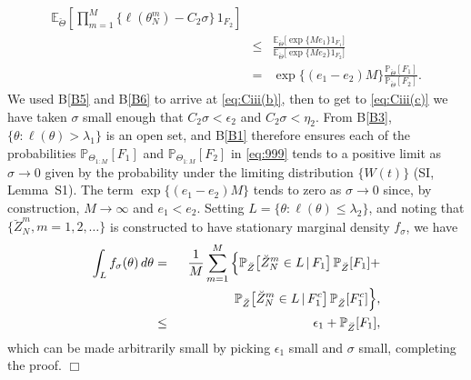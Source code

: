 \documentclass{pnastwo}\usepackage[]{graphicx}\usepackage[]{color}
\newcommand\levelii{{\lambda_2}}
\newcommand\given{{\, | \,}}
\newcommand\lik{\ell}
\newcommand\listB{B}
\newcommand\Cii{C_2}
\newcommand\Msigma{M}
\newcommand\prob{\mathbb{P}}
\newcommand\E{\mathbb{E}}
\begin{document}
\begin{article}
\begin{eqnarray}
{ \E_{\breve \Theta}\left[\prod_{m=1}^M \big\{ \lik(\theta^m_N)-\Cii\sigma \big\} \, 1_{F_2}\right]}
\\  
 \label{eq:Ciii(c)}
&\le& \frac{\E_{\breve \Theta} \big[\exp\{\Msigma e_1\}1_{F_1}\big]}{\E_{\breve \Theta}\big[ \exp\{\Msigma e_2\}1_{F_2}\big]} 
\\
&=& \exp\big\{(e_1-e_2)\Msigma\big\} \frac{\prob_{\breve\Theta}[F_1]}{\prob_{\breve\Theta}[F_2]}. 
\label{eq:999}
\end{eqnarray}
We used B\ref{B5} and B\ref{B6} to arrive at \eqref{eq:Ciii(b)}, then to get to \eqref{eq:Ciii(c)} we have  taken  $\sigma$ small enough that $\Cii\sigma<\epsilon_2$ and $\Cii\sigma<\eta_2$.
From \listB\ref{B3}, $\{\theta:\lik(\theta)>\lambda_1\}$ is an open set, and \listB\ref{B1} therefore ensures each of the probabilities $\prob_{\Theta_{1:\Msigma}}[F_1]$ and $\prob_{\Theta_{1:\Msigma}}[F_2]$ in \eqref{eq:999} tends to a positive limit as $\sigma\to 0$ given by the probability under the limiting distribution $\{W(t)\}$  (SI, Lemma~S1).
The term $\exp\{(e_1-e_2)\Msigma\}$ tends to zero as $\sigma\to 0$ since, by construction, $M\to\infty$ and $e_1<e_2$.
Setting $L=\{\theta:\lik(\theta)\le \levelii\}$, and noting that $\{\breve Z^m_N, m=1,2,\dots\}$ is constructed to have stationary marginal density $f_\sigma$, we have
\begin{eqnarray} \nonumber
\int_L f_\sigma(\theta)\, d\theta 
&=&\frac{1}{M}\sum_{m=1}^M\Big\{\prob_{\breve Z} \big[\breve Z^m_N\in L \given F_1\big]\,\prob_{\breve Z}[F_1] + 
\\ \nonumber
&& \hspace{15mm} \prob_{\breve Z} \big[\breve Z^m_N\in L \given F^c_1\big]\,\prob_{\breve Z}[F^c_1]\Big\},
\\ \nonumber
&\le& \epsilon_1 + \prob_{\breve Z}[F_1],
\end{eqnarray}
which can be made arbitrarily small by picking $\epsilon_1$ small and $\sigma$ small, completing the proof. \hfill$\Box$




\end{article}
\end{document}
